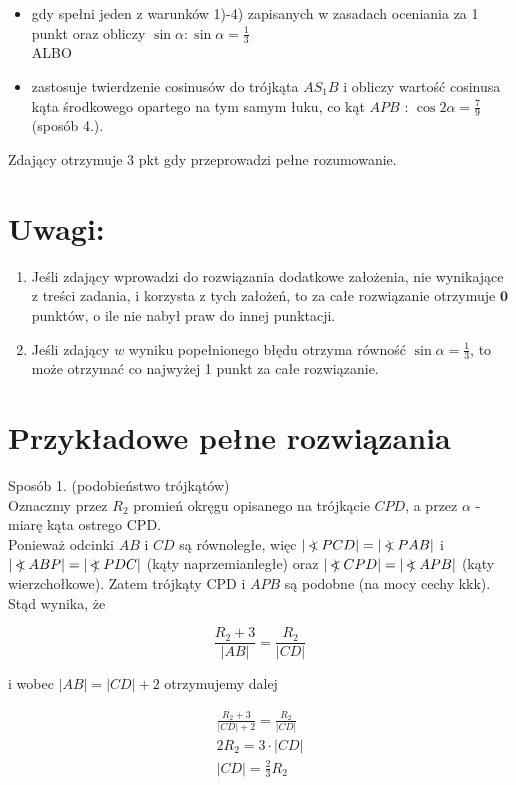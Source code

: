 \documentclass[10pt]{article}
\newcommand\Varangle{\mathop{{<\!\!\!\!\!\text{\small)}}\:}\nolimits}
\begin{document}
\begin{itemize}
  \item gdy spełni jeden z warunków 1)-4) zapisanych w zasadach oceniania za 1 punkt oraz obliczy $\sin \alpha: \sin \alpha=\frac{1}{3}$\\
ALBO
  \item zastosuje twierdzenie cosinusów do trójkąta $A S_{1} B$ i obliczy wartość cosinusa kąta środkowego opartego na tym samym łuku, co kąt $A P B$ : $\cos 2 \alpha=\frac{7}{9}$ (sposób 4.).
\end{itemize}

Zdający otrzymuje 3 pkt gdy przeprowadzi pełne rozumowanie.

\section*{Uwagi:}
\begin{enumerate}
  \item Jeśli zdający wprowadzi do rozwiązania dodatkowe założenia, nie wynikające z treści zadania, i korzysta z tych założeń, to za całe rozwiązanie otrzymuje $\mathbf{0}$ punktów, o ile nie nabył praw do innej punktacji.
  \item Jeśli zdający $w$ wyniku popełnionego błędu otrzyma równość $\sin \alpha=\frac{1}{3}$, to może otrzymać co najwyżej 1 punkt za całe rozwiązanie.
\end{enumerate}

\section*{Przykładowe pełne rozwiązania}
Sposób 1. (podobieństwo trójkątów)\\
Oznaczmy przez $R_{2}$ promień okręgu opisanego na trójkącie $C P D$, a przez $\alpha$ - miarę kąta ostrego CPD.\\
Ponieważ odcinki $A B$ i $C D$ są równoległe, więc $|\Varangle P C D|=|\Varangle P A B|$ i $|\Varangle A B P|=|\Varangle P D C|$ (kąty naprzemianległe) oraz $|\Varangle C P D|=|\Varangle A P B|$ (kąty wierzchołkowe). Zatem trójkąty CPD i $A P B$ są podobne (na mocy cechy kkk). Stąd wynika, że

$$
\frac{R_{2}+3}{|A B|}=\frac{R_{2}}{|C D|}
$$

i wobec $|A B|=|C D|+2$ otrzymujemy dalej

$$
\begin{gathered}
\frac{R_{2}+3}{|C D|+2}=\frac{R_{2}}{|C D|} \\
2 R_{2}=3 \cdot|C D| \\
|C D|=\frac{2}{3} R_{2}
\end{gathered}
$$
\end{document}
